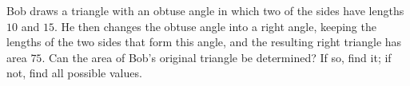Bob draws a triangle with an obtuse angle in which two of the sides have lengths $10$ and $15$. He then changes the obtuse angle into a right angle, keeping the lengths of the two sides that form this angle, and the resulting right triangle has area $75$. Can the area of Bob's original triangle be determined? If so, find it; if not, find all possible values.
